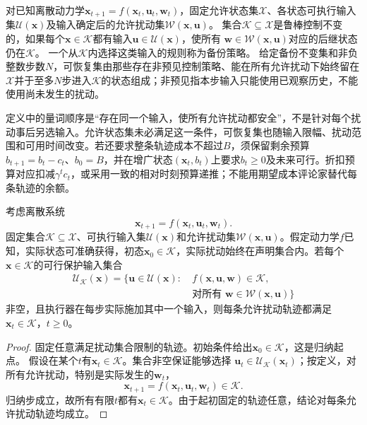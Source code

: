 \begin{definition}[控制不变集与可恢复集]
  \label{def:rl-trustworthy-invariance}
  对已知离散动力学$\bm{x}_{t+1}=f(\bm{x}_t,\bm{u}_t,\bm{w}_t)$，固定允许状态集$\mathcal X$、各状态可执行输入集$\mathcal U(\bm{x})$及输入确定后的允许扰动集$\mathcal W(\bm{x},\bm{u})$。
  集合$\mathcal K\subseteq\mathcal X$是鲁棒控制不变的，如果每个$\bm{x}\in\mathcal K$都有输入$\bm{u}\in\mathcal U(\bm{x})$，使所有
  $\bm{w}\in\mathcal W(\bm{x},\bm{u})$对应的后继状态仍在$\mathcal K$。
  一个从$\mathcal K$内选择这类输入的规则称为备份策略。
  给定备份不变集和非负整数步数$N$，可恢复集由那些存在非预见控制策略、能在所有允许扰动下始终留在$\mathcal X$并于至多$N$步进入$\mathcal K$的状态组成；非预见指本步输入只能使用已观察历史，不能使用尚未发生的扰动。
\end{definition}

定义中的量词顺序是“存在同一个输入，使所有允许扰动都安全”，不是针对每个扰动事后另选输入。允许状态集未必满足这一条件，可恢复集也随输入限幅、扰动范围和可用时间改变。若还要求整条轨迹成本不超过$B$，须保留剩余预算
$b_{t+1}=b_t-c_t$、$b_0=B$，并在增广状态$(\bm{x}_t,b_t)$上要求$b_t\geq0$及未来可行。折扣预算对应扣减$\gamma^tc_t$，或采用一致的相对时刻预算递推；不能用期望成本评论家替代每条轨迹的余额。

\begin{theorem}[安全集的一步封闭性保证]
  \label{thm:rl-trustworthy-invariance}
  考虑离散系统
  \[
    \bm{x}_{t+1}=f(\bm{x}_t,\bm{u}_t,\bm{w}_t).
  \]
  固定集合$\mathcal K\subseteq\mathcal X$、可执行输入集$\mathcal U(\bm{x})$和允许扰动集$\mathcal W(\bm{x},\bm{u})$。假定动力学$f$已知，实际状态可准确获得，初态$\bm{x}_0\in\mathcal K$，实际扰动始终在声明集合内。若每个$\bm{x}\in\mathcal K$的可行保护输入集合
  \[
    \begin{aligned}
      \mathcal U_{\mathcal K}(\bm{x})
        =\bigl\{\bm{u}\in\mathcal U(\bm{x}):\ &
          f(\bm{x},\bm{u},\bm{w})\in\mathcal K,\\
        &\text{对所有 }\bm{w}\in\mathcal W(\bm{x},\bm{u})\bigr\}
    \end{aligned}
  \]
  非空，且执行器在每步实际施加其中一个输入，则每条允许扰动轨迹都满足$\bm{x}_t\in\mathcal K$，$t\geq0$。
\end{theorem}
\begin{proof}
  固定任意满足扰动集合限制的轨迹。初始条件给出$\bm{x}_0\in\mathcal K$，这是归纳起点。
  假设在某个$t$有$\bm{x}_t\in\mathcal K$。集合非空保证能够选择
  $\bm{u}_t\in\mathcal U_{\mathcal K}(\bm{x}_t)$；按定义，对所有允许扰动，特别是实际发生的$\bm{w}_t$，
  \[
    \bm{x}_{t+1}=f(\bm{x}_t,\bm{u}_t,\bm{w}_t)\in\mathcal K.
  \]
  归纳步成立，故所有有限$t$都有$\bm{x}_t\in\mathcal K$。由于起初固定的轨迹任意，结论对每条允许扰动轨迹均成立。
\end{proof}

